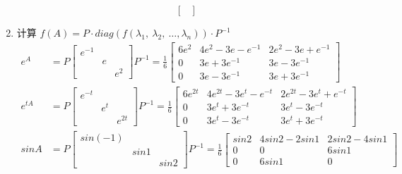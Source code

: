 \begin{solution}
\begin{enumerate}
\begin{equation*}
\begin{bmatrix}
                            \end{bmatrix}
                        \end{equation*}
                    \item 计算 $f(A) = P \cdot diag(f(\lambda_1, \ \lambda_2, \ \dots, \lambda_n)) \cdot P^{-1}$
                        \begin{align*}
                            e^A &= P \begin{bmatrix} 
                                e^{-1} & & \\ & e & \\ & & e^2
                            \end{bmatrix} P^{-1} = \frac{1}{6}\begin{bmatrix}
                                6e^2 & 4e^2-3e-e^{-1} & 2e^2-3e+e^{-1} \\ 0 & 3e+3e^{-1} & 3e-3e^{-1} \\ 0 & 3e-3e^{-1} & 3e + 3e^{-1}
                            \end{bmatrix} \\ e^{tA} &= P \begin{bmatrix}
                                e^{-t} & & \\ & e^t & \\ & & e^{2t}
                            \end{bmatrix} P^{-1} = \frac{1}{6}\begin{bmatrix}
                                6e^{2t} & 4e^{2t}-3e^t-e^{-t} & 2e^{2t}-3e^t+e^{-t} \\ 0 & 3e^t+3e^{-t} & 3e^t-3e^{-t} \\ 0 & 3e^t-3e^{-t} & 3e^t + 3e^{-t}
                            \end{bmatrix} \\ sinA &= P \begin{bmatrix}
                                sin(-1) & & \\ & sin1 & \\ & & sin2
                            \end{bmatrix} P^{-1} = \frac{1}{6}\begin{bmatrix}
                                sin2 & 4sin2-2sin1 & 2sin2-4sin1 \\ 0 & 0 & 6sin1 \\ 0 & 6sin1 & 0 
                            \end{bmatrix}
                        \end{align*}
                \end{enumerate}
            \end{solution}

